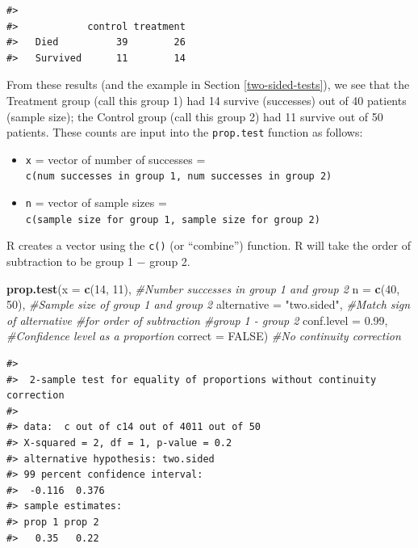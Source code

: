 \documentclass[
  10pt,
  openany]{book}
\newenvironment{Shaded}{\begin{snugshade}}{\end{snugshade}}
\newcommand{\AttributeTok}[1]{\textcolor[rgb]{0.13,0.29,0.53}{#1}}
\newcommand{\CommentTok}[1]{\textcolor[rgb]{0.56,0.35,0.01}{\textit{#1}}}
\newcommand{\ConstantTok}[1]{\textcolor[rgb]{0.56,0.35,0.01}{#1}}
\newcommand{\DecValTok}[1]{\textcolor[rgb]{0.00,0.00,0.81}{#1}}
\newcommand{\FloatTok}[1]{\textcolor[rgb]{0.00,0.00,0.81}{#1}}
\newcommand{\FunctionTok}[1]{\textcolor[rgb]{0.13,0.29,0.53}{\textbf{#1}}}
\newcommand{\NormalTok}[1]{#1}
\newcommand{\StringTok}[1]{\textcolor[rgb]{0.31,0.60,0.02}{#1}}
\providecommand{\tightlist}{%
  \setlength{\itemsep}{0pt}\setlength{\parskip}{0pt}}
\theoremstyle{definition}
\theoremstyle{definition}
\theoremstyle{definition}
\theoremstyle{definition}
\theoremstyle{remark}
\begin{document}
\begin{verbatim}
#>           
#>            control treatment
#>   Died          39        26
#>   Survived      11        14
\end{verbatim}

From these results (and the example in Section \ref{two-sided-tests}), we see that the Treatment group (call this group 1) had 14 survive (successes) out of 40 patients (sample size); the Control group (call this group 2) had 11 survive out of 50 patients. These counts are input into the \texttt{prop.test} function as follows:

\begin{itemize}
\tightlist
\item
  \texttt{x} = vector of number of successes = \texttt{c(num\ successes\ in\ group\ 1,\ num\ successes\ in\ group\ 2)}
\item
  \texttt{n} = vector of sample sizes = \texttt{c(sample\ size\ for\ group\ 1,\ sample\ size\ for\ group\ 2)}
\end{itemize}

R creates a vector using the \texttt{c()} (or ``combine'') function. R will take the order of subtraction to be group 1 \(-\) group 2.

\begin{Shaded}
\begin{Highlighting}[]
\FunctionTok{prop.test}\NormalTok{(}\AttributeTok{x =} \FunctionTok{c}\NormalTok{(}\DecValTok{14}\NormalTok{, }\DecValTok{11}\NormalTok{), }\CommentTok{\#Number successes in group 1 and group 2}
          \AttributeTok{n =} \FunctionTok{c}\NormalTok{(}\DecValTok{40}\NormalTok{, }\DecValTok{50}\NormalTok{), }\CommentTok{\#Sample size of group 1 and group 2}
          \AttributeTok{alternative =} \StringTok{"two.sided"}\NormalTok{, }\CommentTok{\#Match sign of alternative}
                                     \CommentTok{\#for order of subtraction }
                                     \CommentTok{\#group 1 {-} group 2}
          \AttributeTok{conf.level =} \FloatTok{0.99}\NormalTok{, }\CommentTok{\#Confidence level as a proportion}
          \AttributeTok{correct =} \ConstantTok{FALSE}\NormalTok{)  }\CommentTok{\#No continuity correction}
\end{Highlighting}
\end{Shaded}

\begin{verbatim}
#> 
#>  2-sample test for equality of proportions without continuity correction
#> 
#> data:  c out of c14 out of 4011 out of 50
#> X-squared = 2, df = 1, p-value = 0.2
#> alternative hypothesis: two.sided
#> 99 percent confidence interval:
#>  -0.116  0.376
#> sample estimates:
#> prop 1 prop 2 
#>   0.35   0.22
\end{verbatim}
\end{document}

